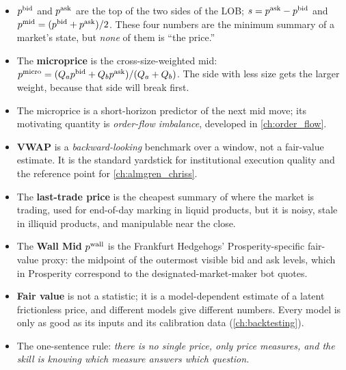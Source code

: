 \begin{itemize}
  \item $p^{\mathrm{bid}}$ and $p^{\mathrm{ask}}$ are the top of the two sides of the LOB;
  $s = p^{\mathrm{ask}} - p^{\mathrm{bid}}$ and $p^{\mathrm{mid}} = (p^{\mathrm{bid}} + p^{\mathrm{ask}})/2$. These
  four numbers are the minimum summary of a market's state, but
  \emph{none} of them is ``the price.''
  \item The \textbf{microprice} is the cross-size-weighted mid:
  $p^{\mathrm{micro}} = (Q_a p^{\mathrm{bid}} + Q_b p^{\mathrm{ask}})/(Q_a + Q_b)$. The side with
  less size gets the larger weight, because that side will break
  first.
  \item The microprice is a short-horizon predictor of the next mid
  move; its motivating quantity is \emph{order-flow imbalance},
  developed in \cref{ch:order_flow}.
  \item \textbf{VWAP} is a \emph{backward-looking} benchmark over a
  window, not a fair-value estimate. It is the standard yardstick
  for institutional execution quality and the reference point for
  \cref{ch:almgren_chriss}.
  \item The \textbf{last-trade price} is the cheapest summary of
  where the market is trading, used for end-of-day marking in liquid
  products, but it is noisy, stale in illiquid products, and
  manipulable near the close.
  \item The \textbf{Wall Mid} $p^{\mathrm{wall}}$ is the Frankfurt Hedgehogs'
  Prosperity-specific fair-value proxy: the midpoint of the outermost
  visible bid and ask levels, which in Prosperity correspond to the
  designated-market-maker bot quotes.
  \item \textbf{Fair value} is not a statistic; it is a
  model-dependent estimate of a latent frictionless price, and
  different models give different numbers. Every model is only as
  good as its inputs and its calibration data
  (\cref{ch:backtesting}).
  \item The one-sentence rule: \emph{there is no single price, only
  price measures, and the skill is knowing which measure answers
  which question.}
\end{itemize}

